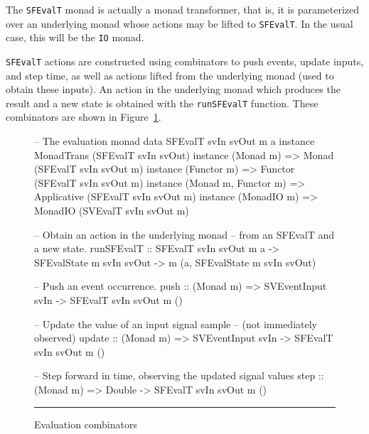 The {\tt SFEvalT} monad is actually a monad transformer, that is, it is
parameterized over an underlying monad whose actions may be lifted to
{\tt SFEvalT}. In the usual case, this will be the {\tt IO} monad.

{\tt SFEvalT} actions are constructed using combinators to push events,
update inputs, and step time, as well as actions lifted from the underlying
monad (used to obtain these inputs). An action in the underlying monad
which produces the result and a new state is obtained with the {\tt runSFEvalT}
function. These combinators are shown in Figure~\ref{figure:evaluation_combinators}.

\begin{figure}
\begin{code}
-- The evaluation monad
data SFEvalT svIn svOut m a
instance MonadTrans (SFEvalT svIn svOut)
instance (Monad m) => Monad (SFEvalT svIn svOut m)
instance (Functor m) => Functor (SFEvalT svIn svOut m)
instance (Monad m, Functor m) => Applicative (SFEvalT svIn svOut m)
instance (MonadIO m) => MonadIO (SVEvalT svIn svOut m)

-- Obtain an action in the underlying monad
-- from an SFEvalT and a new state.
runSFEvalT ::    SFEvalT svIn svOut m a
              -> SFEvalState m svIn svOut
              -> m (a, SFEvalState m svIn svOut)

-- Push an event occurrence.
push :: (Monad m) => SVEventInput svIn -> SFEvalT svIn svOut m ()

-- Update the value of an input signal sample
-- (not immediately observed)
update :: (Monad m) => SVEventInput svIn -> SFEvalT svIn svOut m ()

-- Step forward in time, observing the updated signal values
step :: (Monad m) => Double -> SFEvalT svIn svOut m ()
\end{code}
\hrule
\caption{Evaluation combinators}
\label{figure:evaluation_combinators}
\end{figure}
